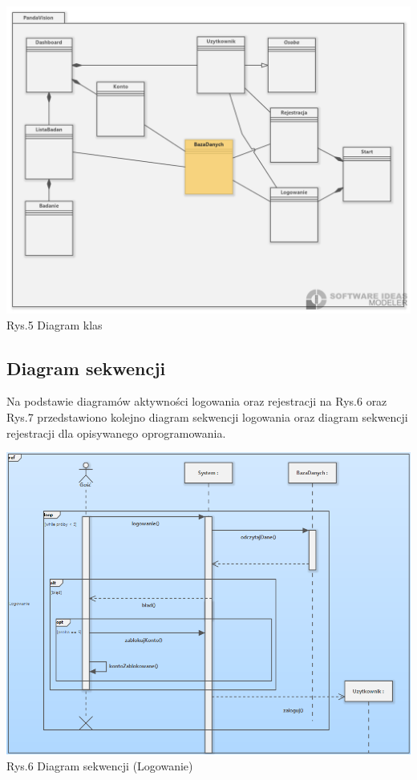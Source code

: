\documentclass[12pt, letterpaper]{article}
\begin{document}
		\begin{center}
			\includegraphics[scale=0.5]{classDiagram}\\
			\caption{Rys.5 Diagram klas}
		\end{center}
		
		
		\newpage

		\subsection{Diagram sekwencji}
		
		Na podstawie diagramów aktywności logowania oraz rejestracji na Rys.6 oraz Rys.7 przedstawiono kolejno diagram sekwencji logowania oraz diagram sekwencji rejestracji dla opisywanego oprogramowania.
		
		\begin{center}
			\includegraphics[scale=0.6]{seqDiagram}\\
			\caption{Rys.6 Diagram sekwencji (Logowanie)}
		\end{center}
		
\end{document}
